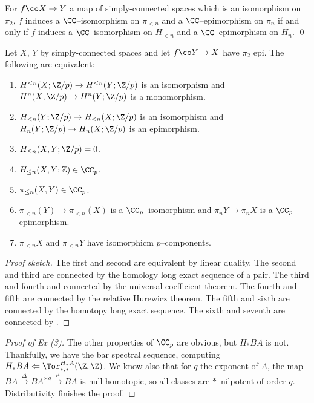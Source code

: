 \begin{theorem}[Whitehead]
For $f\co X \to Y$ a map of simply-connected spaces which is an isomorphism on $\pi_2$, $f$ induces a $\CC$--isomorphism on $\pi_{< n}$ and a $\CC$--epimorphism on $\pi_n$ if and only if $f$ induces a $\CC$--isomorphism on $H_{< n}$ and a $\CC$--epimorphism on $H_n$. \qed
\end{theorem}

\begin{theorem}[Approximation]
Let $X$, $Y$ by simply-connected spaces and let $f\co Y \to X$ have $\pi_2$ epi.  The following are equivalent:
\begin{enumerate}
    \item $H^{< n}(X; \Z/p) \to H^{< n}(Y; \Z/p)$ is an isomorphism and $H^n(X; \Z/p) \to H^n(Y; \Z/p)$ is a monomorphism.
    \item $H_{< n}(Y; \Z/p) \to H_{< n}(X; \Z/p)$ is an isomorphism and $H_n(Y; \Z/p) \to H_n(X; \Z/p)$ is an epimorphism.
    \item $H_{\le n}(X, Y; \Z/p) = 0$.
    \item $H_{\le n}(X, Y; \mathbb Z) \in \CC_p$.
    \item $\pi_{\le n}(X, Y) \in \CC_p$.
    \item $\pi_{< n}(Y) \to \pi_{< n}(X)$ is a $\CC_p$--isomorphism and $\pi_n Y \to \pi_n X$ is a $\CC_p$--epimorphism.
    \item $\pi_{< n} X$ and $\pi_{< n} Y$ have isomorphicm $p$--components.
\end{enumerate}
\end{theorem}
\begin{proof}[Proof sketch]
The first and second are equivalent by linear duality.  The second and third are connected by the homology long exact sequence of a pair.  The third and fourth and connected by the universal coefficient theorem.  The fourth and fifth are connected by the relative Hurewicz theorem.  The fifth and sixth are connected by the homotopy long exact sequence.  The sixth and seventh are connected by .
\end{proof}

\begin{proof}[Proof of Ex (3)]
The other properties of $\CC_p$ are obvious, but $H_* BA$ is not.  Thankfully, we have the bar spectral sequence, computing $H_* BA \Leftarrow \Tor^{H_* A}_{*, *}(\Z, \Z)$.  We know also that for $q$ the exponent of $A$, the map $BA \xrightarrow\Delta BA^{\times q} \xrightarrow\mu BA$ is null-homotopic, so all classes are $*$--nilpotent of order $q$.  Distributivity finishes the proof.
\end{proof}

